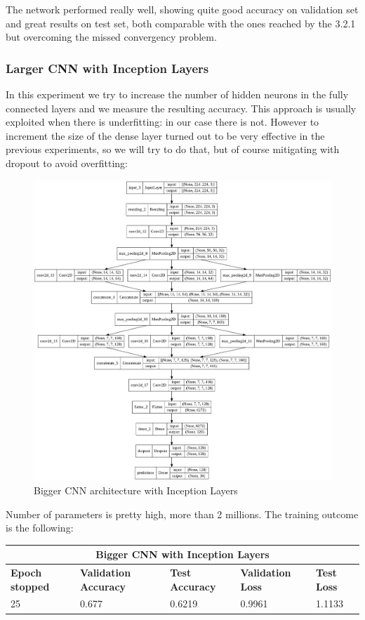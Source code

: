 \medskip

\noindent The network performed really well, showing quite good accuracy on validation set and great results on test set, both comparable with the ones reached by the 3.2.1 but overcoming the missed convergency problem. 


\subsubsection{Larger CNN with Inception Layers}
In this experiment we try to increase the number of hidden neurons in the fully connected layers and we measure the resulting accuracy. This approach is usually exploited when there is underfitting: in our case there is not. However to increment the size of the dense layer turned out to be very effective in the previous experiments, so we will try to do that, but of course mitigating with dropout to avoid overfitting:

\begin{figure}[H]
	\centering
	\includegraphics[height=0.8\textwidth]{img/scratch/larger_inception_layers.jpg}
	\caption{Bigger CNN architecture with Inception Layers}
	\label{fig: LargerInceptionLayersCNN}
\end{figure}

\noindent Number of parameters is pretty high, more than 2 millions. The training outcome is the following:

\medskip

\begin{tabular}{ |p{2cm}|p{2cm}|p{2cm}|p{2cm}|p{2cm}|  }
\hline
\multicolumn{5}{|c|}{Bigger CNN with Inception Layers} \\
\hline
\textbf{Epoch stopped} & \textbf{Validation Accuracy} & \textbf{Test Accuracy} & \textbf{Validation Loss} & \textbf{Test Loss} \\
\hline
25 & 0.677 & 0.6219 & 0.9961 & 1.1133\\
\hline
\end{tabular}

